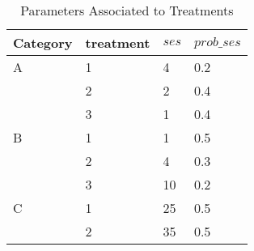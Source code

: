 \begin{table}[h]
\begin{tabular}{llll}
\hline
\multicolumn{1}{|l|}{Category} & \multicolumn{1}{l|}{treatment} & \multicolumn{1}{l|}{$ses$} & \multicolumn{1}{l|}{$prob\_ses$} \\ \hline
A                              & 1                              & 4                          & 0.2                              \\
                               & 2                              & 2                          & 0.4                              \\
                               & 3                              & 1                          & 0.4                              \\
B                              & 1                              & 1                          & 0.5                              \\
                               & 2                              & 4                          & 0.3                              \\
                               & 3                              & 10                         & 0.2                              \\
C                              & 1                              & 25                         & 0.5                              \\
                               & 2                              & 35                         & 0.5                                
\end{tabular}
\caption{Parameters Associated to Treatments}
\end{table}

